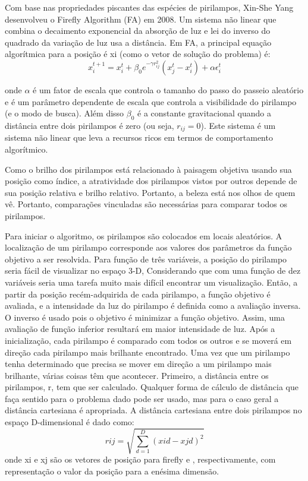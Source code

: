 \documentclass[10pt]{article}
\begin{document}
Com base nas propriedades piscantes das espécies de 
pirilampos, Xin-She Yang desenvolveu o 
Firefly Algorithm (FA) em 2008. Um sistema não linear que 
combina o decaimento exponencial da absorção de luz e lei do 
inverso do quadrado da variação de luz usa a distância. 
Em FA, a principal equação algorítmica para a posição é xi 
(como o vetor de solução do problema) é:
\begin{equation}
  x_i^{t+1} = x_i^t + \beta_0e^{-\gamma r^2_{ij}}(x_j^t - x_i^t) + \alpha \epsilon_i^t
\end{equation}

onde \(\alpha\) é um fator de escala que controla o tamanho 
do passo do passeio aleatório e \gamma é um parâmetro 
dependente de escala que controla a visibilidade do pirilampo
(e o modo de busca). Além disso \(\beta_0\) é a constante 
gravitacional quando a distância entre dois pirilampos é zero
(ou seja, \(r_{ij} = 0\)). Este sistema é um sistema não 
linear que leva a recursos ricos em termos de comportamento 
algorítmico.

Como o brilho dos pirilampos está relacionado à paisagem 
objetiva usando sua posição como índice, a atratividade dos 
pirilampos vistos por outros depende de sua posição relativa
e brilho relativo. Portanto, a beleza está nos olhos de quem vê.
Portanto, comparações vinculadas são necessárias para 
comparar todos os pirilampos.


Para iniciar o algoritmo, os pirilampos são colocados em locais aleatórios. A localização de um pirilampo
corresponde aos valores dos parâmetros da função objetivo a ser resolvida. Para
função de três variáveis, a posição do pirilampo seria fácil de visualizar no espaço 3-D,
Considerando que com uma função de dez variáveis seria uma tarefa muito mais difícil encontrar um
visualização. Então, a partir da posição recém-adquirida de cada pirilampo, a função objetivo é
avaliada, e a intensidade da luz do pirilampo é definida como a avaliação inversa. O inverso é usado
pois o objetivo é minimizar a função objetivo. Assim, uma avaliação de função inferior resultará
em maior intensidade de luz. 
Após a inicialização, cada pirilampo é comparado com todos os outros e se moverá em direção
cada pirilampo mais brilhante encontrado. Uma vez que um pirilampo tenha determinado que precisa se mover em direção a um
pirilampo mais brilhante, várias coisas têm que acontecer. Primeiro, a distância entre os pirilampos, r, tem que
ser calculado. Qualquer forma de cálculo de distância que faça sentido para o problema dado pode ser
usado, mas para o caso geral a distância cartesiana é apropriada. A distância cartesiana
entre dois pirilampos no espaço D-dimensional é dado como:
\begin{equation}
  rij = \sqrt{\sum_{d=1}^{D} (xid -xjd)^2}
\end{equation}
onde xi e xj são os vetores de posição para firefly e , respectivamente, com representação
o valor da posição para a enésima dimensão.
\end{document}
